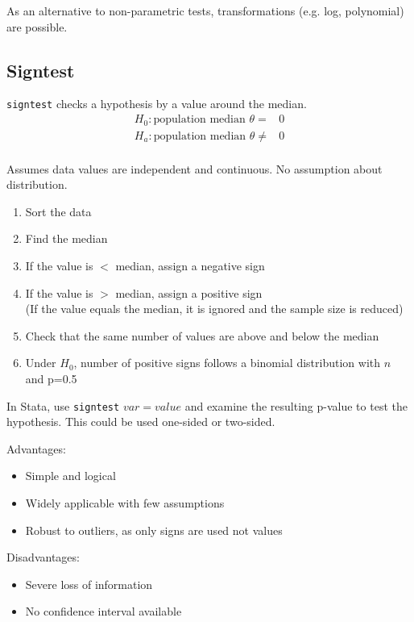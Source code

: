 \documentclass[11pt, oneside]{article}   	%
\begin{document}
As an alternative to non-parametric tests, transformations (e.g. log, polynomial) are possible.

\subsection{Signtest}

\texttt{signtest} checks a hypothesis by a value around the median.
\begin{align*}
H_0 : \text{population median } \theta =& 0 \\
H_a : \text{population median } \theta \neq& 0\\
\end{align*}

Assumes data values are independent and continuous. No assumption about distribution. 

\begin{enumerate}
\item{Sort the data}
\item{Find the median}
\item{If the value is $< $ median, assign a negative sign}
\item{If the value is $> $ median, assign a positive sign\\
	(If the value equals the median, it is ignored and the sample size is reduced)}
\item{Check that the same number of values are above and below the median} 
\item{Under $H_0$, number of positive signs follows a binomial distribution with $n$ and p=0.5}
\end{enumerate}

In Stata, use \texttt{signtest} $var=value$ and examine the resulting p-value to test the hypothesis. This could be used one-sided or two-sided.

Advantages:
\begin{itemize}
\item{Simple and logical}
\item{Widely applicable with few assumptions}
\item{Robust to outliers, as only signs are used not values}
\end{itemize}

Disadvantages:
\begin{itemize}
\item{Severe loss of information}
\item{No confidence interval available}
\end{itemize}
\end{document}
